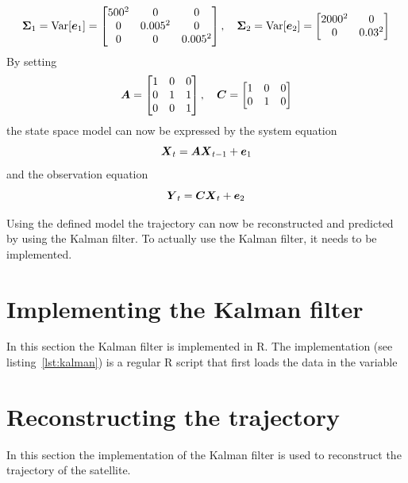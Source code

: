 \begin{equation*}
    \boldsymbol{\Sigma}_1 = \text{Var}[\boldsymbol{e}_1] = \begin{bmatrix}
        500^2 & 0 & 0 \\
        0 & 0.005^2 & 0 \\
        0 & 0 & 0.005^2
    \end{bmatrix}, \quad \boldsymbol{\Sigma}_2 = \text{Var}[\boldsymbol{e}_2] = \begin{bmatrix}
        2000^2 & 0 \\
        0 & 0.03^2
    \end{bmatrix}
\end{equation*}
By setting
\begin{equation*}
    \boldsymbol{A} = \begin{bmatrix}
        1 & 0 & 0 \\
        0 & 1 & 1 \\
        0 & 0 & 1
    \end{bmatrix}, \quad \boldsymbol{C} = \begin{bmatrix}
        1 & 0 & 0 \\
        0 & 1 & 0
    \end{bmatrix}
\end{equation*}
the state space model can now be expressed by the system equation
\begin{equation*}
    \boldsymbol{X}_t = \boldsymbol{A}\boldsymbol{X}_{t-1} + \boldsymbol{e}_1
\end{equation*}
and the observation equation
\begin{equation*}
    \boldsymbol{Y}_t = \boldsymbol{C}\boldsymbol{X}_t + \boldsymbol{e}_2
\end{equation*}

Using the defined model the trajectory can now be reconstructed and predicted by using the Kalman filter. To actually use the Kalman filter, it needs to be implemented.

\section*{Implementing the Kalman filter}
In this section the Kalman filter is implemented in R. The implementation (see listing~\ref{lst:kalman}) is a regular R script that first loads the data in the variable 

\vspace{3mm}



\section*{Reconstructing the trajectory}
In this section the implementation of the Kalman filter is used to reconstruct the trajectory of the satellite.

